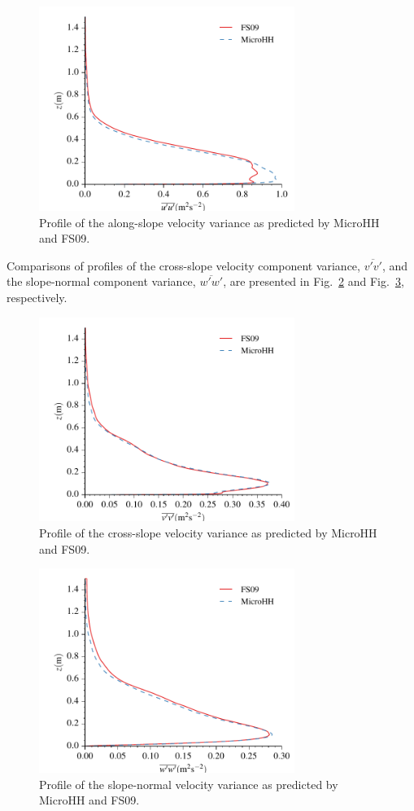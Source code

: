 \documentclass[gmd]{copernicus}
\begin{document}
\begin{figure}
	\centerline{\includegraphics[width=8.3cm]{figs/katabatic_uu.pdf}}
	\caption{Profile of the along-slope velocity variance as predicted by MicroHH and FS09.}
	\label{katabatic_uu}
\end{figure}

Comparisons of profiles of the cross-slope velocity component variance, $\overline{v'v'}$, and the slope-normal component variance, $\overline{w'w'}$, are presented in Fig.~\ref{katabatic_vv} and Fig.~\ref{katabatic_ww}, respectively.

\begin{figure}
	\centerline{\includegraphics[width=8.3cm]{figs/katabatic_vv.pdf}}
	\caption{Profile of the cross-slope velocity variance as predicted by MicroHH and FS09.}
	\label{katabatic_vv}
\end{figure}

\begin{figure}
	\centerline{\includegraphics[width=8.3cm]{figs/katabatic_ww.pdf}}
	\caption{Profile of the slope-normal velocity variance as predicted by MicroHH and FS09.}
	\label{katabatic_ww}
\end{figure}
\end{document}
